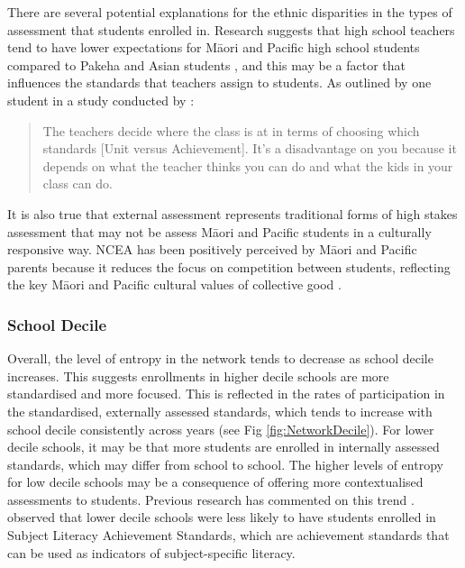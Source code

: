 There are several potential explanations for the ethnic disparities in the types of assessment that students enrolled in. Research suggests that high school teachers tend to have lower expectations for M\={a}ori and Pacific high school students compared to Pakeha and Asian students \citep{turner2015teacher}, and this may be a factor that influences the standards that teachers assign to students. As outlined by one student in a study conducted by \citet{graham2010Maori}:
\blockquote{The teachers decide where the class is at in terms of choosing which standards [Unit versus Achievement]. It's a disadvantage on you because
it depends on what the teacher thinks you can do and what the kids in your class can do.}.  It is also true that external assessment represents traditional forms of high stakes assessment that may not be assess M\={a}ori and Pacific students in a culturally responsive way. NCEA has been positively perceived by M\={a}ori and Pacific parents because it reduces the focus on competition between students, reflecting the key M\={a}ori and Pacific cultural values of collective good \citep{graham2010Maori}.


\subsubsection*{School Decile}

Overall, the level of entropy in the network tends to decrease as school decile increases. This suggests enrollments in higher decile schools are more standardised and more focused. This is reflected in the rates of participation in the standardised, externally assessed standards, which tends to increase with school decile consistently across years (see Fig \ref{fig:NetworkDecile}). For lower decile schools, it may be that more students are enrolled in internally assessed standards, which may differ from school to school. The higher levels of entropy for low decile schools may be a consequence of offering more contextualised assessments to students. Previous research has commented on this trend \citep{hipkins2016ncea}. \citet{wilson2017subject} observed that lower decile schools were less likely to have students enrolled in Subject Literacy Achievement Standards, which are achievement standards that can be used as indicators of subject-specific literacy.  

 

